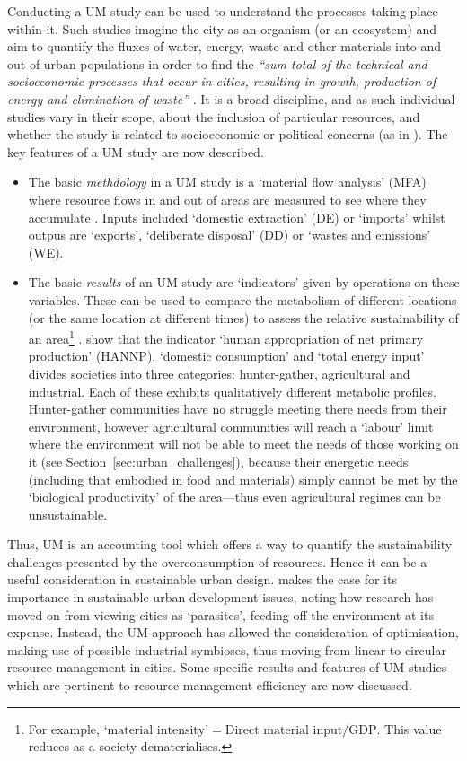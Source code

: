 Conducting a UM study can be used to understand the processes taking place within it. Such studies imagine the city as an organism (or an ecosystem) and aim to quantify the fluxes of water, energy, waste and other materials into and out of urban populations in order to find the \emph{``sum total of the technical and socioeconomic processes that occur in cities, resulting in growth, production of energy and elimination of waste''} \citep[p. 44]{Kennedy2008}. It is a broad discipline, and as such individual studies vary in their scope, about the inclusion of particular resources, and whether the study is related to socioeconomic or political concerns (as in \citet{Hobbes2007}). The key features of a UM study are now described.
\begin{itemize}
	\item The basic \emph{methdology} in a UM study is a `material flow analysis' (MFA) where resource flows in and out of areas are measured to see where they accumulate \citep{Barles2009}. Inputs included `domestic extraction' (DE) or `imports' whilst outpus are `exports', `deliberate disposal' (DD) or `wastes and emissions' (WE). 
	\item The basic \emph{results} of an UM study are `indicators' given by operations on these variables. These can be used to compare the metabolism of different locations (or the same location at different times) to assess the relative sustainability of an area\footnote{For example, $\mbox{`material intensity'}=\mbox{Direct material input}/\mbox{GDP}$. This value reduces as a society dematerialises.} \citep{Hobbes2005}. \citet{Haberl2001a, Haberl2001b} show that the indicator `human appropriation of net primary production' (HANNP), `domestic consumption' and `total energy input' divides societies into three categories: hunter-gather, agricultural and industrial. Each of these exhibits qualitatively different metabolic profiles. Hunter-gather communities have no struggle meeting there needs from their environment, however agricultural communities will reach a `labour' limit where the environment will not be able to meet the needs of those working on it (see Section~\ref{sec:urban_challenges}), because their energetic needs (including that embodied in food and materials) simply cannot be met by the `biological productivity' of the area---thus even agricultural regimes can be unsustainable. 
\end{itemize}
Thus, UM is an accounting tool which offers a way to quantify the sustainability challenges presented by the overconsumption of resources. Hence it can be a useful consideration in sustainable urban design. \citet{Barles2010} makes the case for its importance in sustainable urban development issues, noting how research has moved on from viewing cities as `parasites', feeding off the environment at its expense. Instead, the UM approach has allowed the consideration of optimisation, making use of possible industrial symbioses, thus moving from linear to circular resource management in cities. Some specific results and features of UM studies which are pertinent to resource management efficiency are now discussed.
